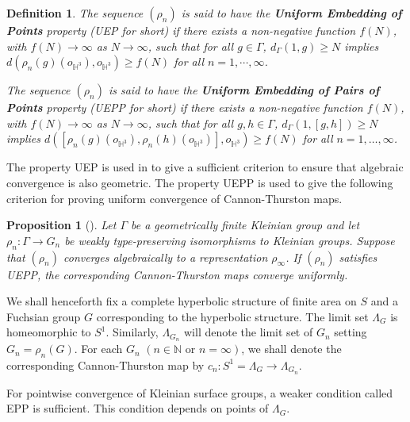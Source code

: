 \documentclass{amsart}
\newtheorem{definition}[theorem]{Definition}
\newtheorem{prop}[theorem]{Proposition}
\theoremstyle{definition}
\newcommand{\Ga}{\Gamma}
\newcommand{\naturals}{\mathbb{N}}
\newcommand\HHH{{\mathbb H}}
\begin{document}
	
	\begin{definition} \label{uep}
	The sequence 
	$(\rho_n)$ is said to have the
	{\bf  Uniform Embedding of Points} property (UEP for short)
	if there
	exists a non-negative function  $f(N)$, with
	$f(N)\rightarrow\infty$ as $N\rightarrow\infty$, such that for all $g
	\in \Ga$, 
	$d_\Ga (1,g) \geq N$ implies  $d (\rho_n(g) (o_{\HHH^3}) , o_{\HHH^3}) \geq
	f(N)$ for all $n = 1, \cdots, \infty$. 
	
	The sequence 
	$(\rho_n)$ is said to have the
	{\bf  Uniform Embedding of Pairs of Points} property (UEPP for short)
	if there
	exists a non-negative function  $f(N)$, with
	$f(N)\rightarrow\infty$ as $N\rightarrow\infty$, such that for all $g, h
	\in \Ga$, $d_\Ga (1,[g,h] ) \geq N$ implies  $d ([\rho_n(g) (o_{\HHH^3}), \rho_n(h) (o_{\HHH^3})] , o_{\HHH^3}) \geq
	f(N)$ for all $n = 1, \ldots, \infty$.
\end{definition}



The property UEP is used in \cite{mahan-series1} to give a sufficient criterion to ensure that
algebraic convergence is also geometric. The property UEPP is used to give the following 
criterion for proving uniform convergence of Cannon-Thurston maps.

\begin{prop}[\cite{mahan-series1}]\label{unifcrit1} Let $\Ga$ be a geometrically finite Kleinian group  and let $\rho_n: \Ga \to G_n$ be  weakly type-preserving  isomorphisms to Kleinian groups. 
	Suppose that $(\rho_n)$ converges algebraically to a 
	representation $\rho_{\infty}$. If   $(\rho_n)$ satisfies UEPP, the corresponding Cannon-Thurston maps  
	converge uniformly. 
\end{prop}

 We shall henceforth fix a complete hyperbolic structure of finite area  on $S$ and
 a Fuchsian group $G$ corresponding to the hyperbolic structure.
The limit set $\Lambda_G$ is homeomorphic to $S^1$.
Similarly, 
 $\Lambda_{G_n}$ will denote the limit set of $G_n$ setting $G_n = \rho_n(G)$.
For each $G_n$ $(n \in \naturals \text{ or } n=\infty)$, we shall denote the corresponding Cannon-Thurston map by $c_n : S^1=\Lambda_G \rightarrow \Lambda_{G_n}$.

For pointwise convergence of Kleinian surface groups, a weaker condition called  EPP is sufficient.
This condition depends on  points of $\Lambda_G$.
\end{document}
